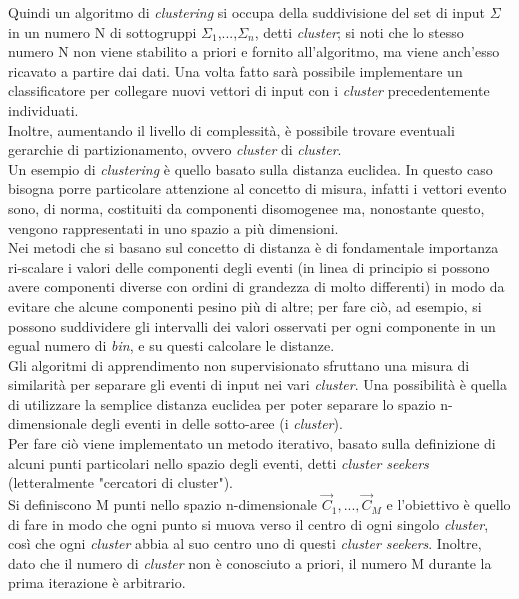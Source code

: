 Quindi un algoritmo di \textit{clustering} si occupa della suddivisione del set di input $\Sigma$ in un numero N di sottogruppi $\Sigma_1$,...,$\Sigma_n$, detti \textit{cluster}; si noti che lo stesso numero N non viene stabilito a priori e fornito all'algoritmo, ma viene anch'esso ricavato a partire dai dati. Una volta fatto sarà possibile implementare un classificatore per collegare nuovi vettori di input con i \textit{cluster} precedentemente individuati.\\
Inoltre, aumentando il livello di complessità, è possibile trovare eventuali gerarchie di partizionamento, ovvero \textit{cluster} di \textit{cluster}.\\
Un esempio di \textit{clustering} è quello basato sulla distanza euclidea. In questo caso bisogna porre particolare attenzione al concetto di misura, infatti i vettori evento sono, di norma, costituiti da componenti disomogenee ma, nonostante questo, vengono rappresentati in uno spazio a più dimensioni.\\
Nei metodi che si basano sul concetto di distanza è di fondamentale importanza ri-scalare i valori delle componenti degli eventi (in linea di principio si possono avere componenti diverse con ordini di grandezza di molto differenti) in modo da evitare che alcune componenti pesino più di altre; per fare ciò, ad esempio, si possono suddividere gli intervalli dei valori osservati per ogni componente in un egual numero di \textit{bin}, e su questi calcolare le distanze. \\
Gli algoritmi di apprendimento non supervisionato sfruttano una misura di similarità per separare gli eventi di input nei vari \textit{cluster}. Una possibilità è quella di utilizzare la semplice distanza euclidea per poter separare lo spazio n-dimensionale degli eventi in delle sotto-aree (i \textit{cluster}). \\
Per fare ciò viene implementato un metodo iterativo, basato sulla definizione di alcuni punti particolari nello spazio degli eventi, detti \textit{cluster seekers} (letteralmente "cercatori di cluster"). \\
Si definiscono M punti nello spazio n-dimensionale $\vec{C}_{1},...,\vec{C}_{M}$ e l'obiettivo è quello di fare in modo che ogni punto si muova verso il centro di ogni singolo \textit{cluster}, così che ogni \textit{cluster} abbia al suo centro uno di questi \textit{cluster seekers}. Inoltre, dato che il numero di \textit{cluster} non è conosciuto a priori, il numero M durante la prima iterazione è arbitrario. \\
